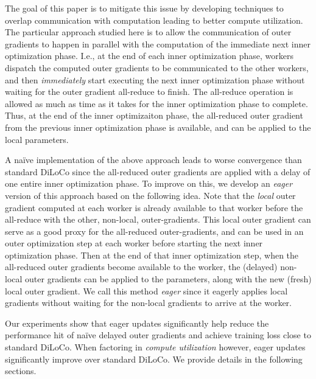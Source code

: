 The goal of this paper is to mitigate this issue by developing techniques to overlap communication with computation leading to better compute utilization. The particular approach studied here is to allow the communication of outer gradients to happen in parallel with the computation of the immediate next inner optimization phase. I.e., at the end of each inner optimization phase, workers dispatch the computed outer gradients to be communicated to the other workers, and then \emph{immediately} start executing the next inner optimization phase without waiting for the outer gradient all-reduce to finish. The all-reduce operation is allowed as much as time as it takes for the inner optimization phase to complete. Thus, at the end of the inner optimizaiton phase, the all-reduced outer gradient from the previous inner optimization phase is available, and can be applied to the local parameters. 

A na\"ive implementation of the above approach leads to worse convergence than standard DiLoCo since the all-reduced outer gradients are applied with a delay of one entire inner optimization phase. To improve on this, we develop an \emph{eager} version of this approach based on the following idea. Note that the \emph{local} outer gradient computed at each worker is already available to that worker before the all-reduce with the other, non-local, outer-gradients. This local outer gradient can serve as a good proxy for the all-reduced outer-gradients, and can be used in an outer optimization step at each worker before starting the next inner optimization phase. Then at the end of that inner optimization step, when the all-reduced outer gradients become available to the worker, the (delayed) non-local outer gradients can be applied to the parameters, along with the new (fresh) local outer gradient. We call this method \emph{eager} since it eagerly applies local gradients without waiting for the non-local gradients to arrive at the worker.

Our experiments show that eager updates significantly help reduce the performance hit of na\"ive delayed outer gradients and achieve training loss close to standard DiLoCo. When factoring in \emph{compute utilization} however, eager updates significantly improve over standard DiLoCo. We provide details in the following sections.


